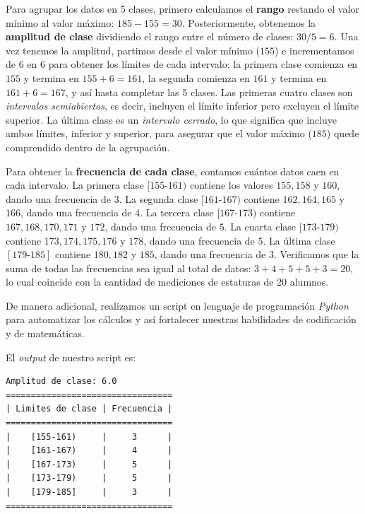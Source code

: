 \documentclass[12pt]{article}
\begin{document}
Para agrupar los datos en 5 clases, primero calculamos el \textbf{rango} restando el valor mínimo al valor máximo: $185 - 155 = 30$. Posteriormente, obtenemos la \textbf{amplitud de clase} dividiendo el rango entre el número de clases: $30/5 = 6$. Una vez tenemos la amplitud, partimos desde el valor mínimo ($155$) e incrementamos de $6$ en $6$ para obtener los límites de cada intervalo: la primera clase comienza en $155$ y termina en $155 + 6 = 161$, la segunda comienza en $161$ y termina en $161 + 6 = 167$, y así hasta completar las 5 clases. Las primeras cuatro clases son \textit{intervalos semiabiertos}, es decir, incluyen el límite inferior pero excluyen el límite superior. La última clase es un \textit{intervalo cerrado}, lo que significa que incluye ambos límites, inferior y superior, para asegurar que el valor máximo ($185$) quede comprendido dentro de la agrupación.

Para obtener la \textbf{frecuencia de cada clase}, contamos cuántos datos caen en cada intervalo. La primera clase $[155\text{-}161)$ contiene los valores $155, 158$ y $160$, dando una frecuencia de $3$. La segunda clase $[161\text{-}167)$ contiene $162, 164, 165$ y $166$, dando una frecuencia de $4$. La tercera clase $[167\text{-}173)$ contiene $167, 168, 170, 171$ y $172$, dando una frecuencia de $5$. La cuarta clase $[173\text{-}179)$ contiene $173, 174, 175, 176$ y $178$, dando una frecuencia de $5$. La última clase $[179\text{-}185]$ contiene $180, 182$ y $185$, dando una frecuencia de $3$. Verificamos que la suma de todas las frecuencias sea igual al total de datos: $3 + 4 + 5 + 5 + 3 = 20$, lo cual coincide con la cantidad de mediciones de estaturas de 20 alumnos.

De manera adicional, realizamos un script en lenguaje de programación \textit{Python} para automatizar los cálculos y así fortalecer nuestras habilidades de codificación y de matemáticas.


El \textit{output} de nuestro script es:
\begin{verbatim}
Amplitud de clase: 6.0
=================================
| Limites de clase | Frecuencia |
=================================
|    [155-161)     |     3      |
|    [161-167)     |     4      |
|    [167-173)     |     5      |
|    [173-179)     |     5      |
|    [179-185]     |     3      |
=================================
\end{verbatim}
\end{document}
